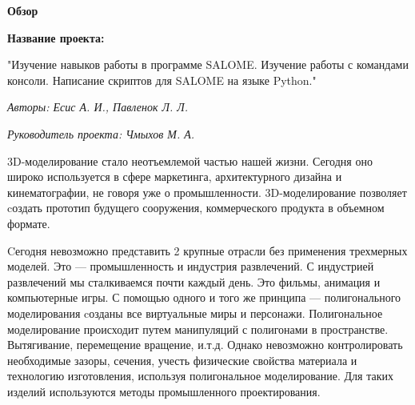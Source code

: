 \documentclass[a4paper,12pt]{article}
\theoremstyle{plain} %
\theoremstyle{definition} %
\theoremstyle{remark} %
\begin{document}
	
	\begin{center}
		
		{\Large\textbf{Обзор}}
		
		\textbf{Название проекта: }
		
		"Изучение навыков работы в программе SALOME. Изучение работы с командами консоли. Написание скриптов для SALOME на языке Python."
		
		\textit{Авторы: Есис А. И., Павленок Л. Л.}
		
		\textit{Руководитель проекта: Чмыхов М. А.}
		
	\end{center}

	3D-моделирование стало неотъемлемой частью нашей жизни. Сегодня оно широко используется в сфере маркетинга, архитектурного дизайна и кинематографии, не говоря уже о промышленности. 3D-моделирование позволяет cоздать прототип будущего сооружения, коммерческого продукта в объемном формате.
	
	Cегодня невозможно представить 2 крупные отрасли без применения трехмерных моделей. Это — промышленность и индустрия развлечений.
	С индустрией развлечений мы сталкиваемся почти каждый день. Это фильмы, анимация и компьютерные игры. С помощью одного и того же принципа — полигонального моделирования cозданы все виртуальные миры и персонажи. Полигональное моделирование происходит путем манипуляций с полигонами в пространстве. Вытягивание, перемещение вращение,  и.т.д. Однако невозможно контролировать необходимые зазоры, сечения, учесть физические свойства материала и технологию изготовления, используя полигональное моделирование. Для таких изделий используются методы промышленного проектирования.
		
\end{document}
